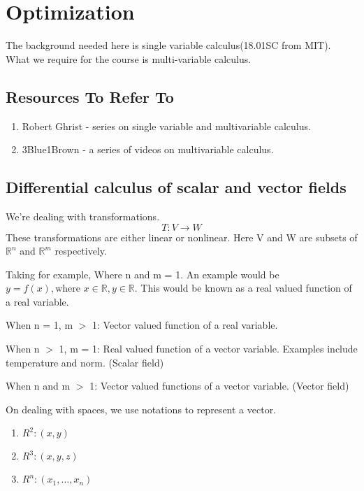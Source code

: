 \documentclass[twoside]{report}
\begin{document}
\chapter{Optimization}
The background needed here is single variable calculus(18.01SC from MIT). What we require for the course is multi-variable calculus.

\section{Resources To Refer To}
	\begin{enumerate}
	\item Robert Ghrist - series on single variable and multivariable calculus.
	\item 3Blue1Brown - a series of videos on multivariable calculus. 
      \end{enumerate}
\section{Differential calculus of scalar and vector fields} %
We're dealing with transformations. 
\[
	T: V \rightarrow W
\]
These transformations are either linear or nonlinear. Here V and W are subsets of $\mathbb{R}^n$ and $\mathbb{R}^m$ respectively.

Taking for example, 
Where n and m = 1. An example would be $y = f(x), \text{where } x \in \mathbb{R}, y \in \mathbb{R}$. This would be known as a real valued function of a real variable.

When n = 1, m $>$ 1: Vector valued function of a real variable.

When n $>$ 1, m = 1: Real valued function of a vector variable. Examples include temperature and norm. (Scalar field)
\label{sec:differential_calculus_of_scalar_and_vector_fields}

When n and m $>$ 1: Vector valued functions of a vector variable. (Vector field)

On dealing with spaces, we use notations to represent a vector. 
\begin{enumerate}
	\item $R^2: (x,y)$
	\item $R^3: (x,y,z)$
	\item $R^n: (x_1, \dots, x_n)$
\end{enumerate}
\end{document}
